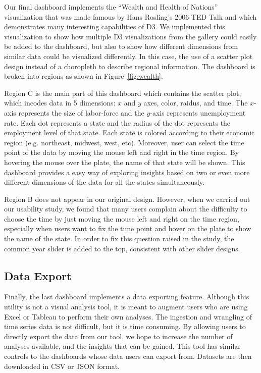 \documentclass[journal]{IEEEtran}
\begin{document}
{Our final dashboard implements the ``Wealth and Health of Nations'' visualization that was made famous by Hans Rosling's 2006 TED Talk \cite{_wealth_????} and which demonstrates many interesting capabilities of D3. We implemented this visualization to show how multiple D3 visualizations from the gallery could easily be added to the dashboard, but also to show how different dimensions from similar data could be visualized differently. In this case, the use of a scatter plot design instead of a choropleth to describe regional information. The dashboard is broken into regions as shown in Figure~\ref{fig:wealth}.

Region C is the main part of this dashboard which contains the scatter plot, which incodes data in 5 dimensions: $x$ and $y$ axes, color, raidus, and time. The $x$-axis represents the size of labor-force and the $y$-axis represents unemployment rate. Each dot represents a state and the radius of the dot represents the employment level of that state. Each state is colored according to their economic region (e.g. northeast, midwest, west, etc). Moreover, user can select the time point of the data by moving the mouse left and right in the time region. By hovering the mouse over the plate, the name of that state will be shown. This dashboard provides a easy way of exploring insights based on two or even more different dimensions of the data for all the states simultaneously.

Region B does not appear in our original design. However, when we carried out our usability study, we found that many users complain about the difficulty to choose the time by just moving the mouse left and right on the time region, especially when users want to fix the time point and hover on the plate to show the name of the state. In order to fix this question raised in the study, the common year slider is added to the top, consistent with other slider designs.

\subsection{Data Export}

Finally, the last dashboard implements a data exporting feature. Although this utility is not a visual analysis tool, it is meant to augment users who are using Excel or Tableau to perform their own analyses. The ingestion and wrangling of time series data is not difficult, but it is time consuming. By allowing users to directly export the data from our tool, we hope to increase the number of analyses available, and the insights that can be gained. This tool has similar controls to the dashboards whose data users can export from. Datasets are then downloaded in CSV or JSON format.

}
\end{document}
